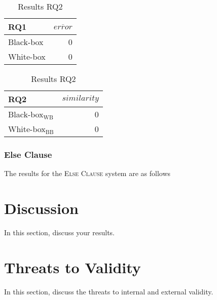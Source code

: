 \begin{table}[H]
\begin{minipage}{.5\linewidth}
    \centering
    \begin{tabular}{lr}
    \toprule
    RQ1     & $\overline{error}$         \\ \midrule
    Black-box & 0              \\
    White-box & 0              \\ \bottomrule
    \end{tabular}  
    \caption{Results RQ1}
\end{minipage}%
\begin{minipage}{.5\linewidth}
    \centering
    \begin{tabular}{lr}
        \toprule
        RQ2     & $similarity$    \\ \midrule
        Black-box$_\text{WB}$ & 0              \\
        White-box$_\text{BB}$ & 0              \\ \bottomrule
        \end{tabular}  
        \caption{Results RQ2}
\end{minipage} 
\end{table}

\subsubsection*{Else Clause}

The results for the \textsc{Else Clause} system are as follows



\section{Discussion}\label{sec:discussion}

In this section, discuss your results.

\section{Threats to Validity}\label{sec:threats}

In this section, discuss the threats to internal and external validity.
